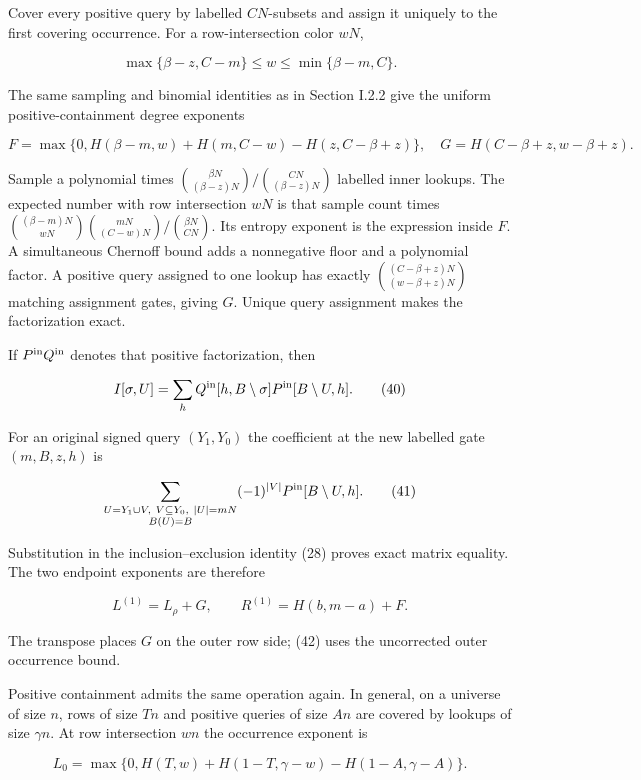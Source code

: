 Cover every positive query by labelled \(CN\)-subsets and assign it uniquely to the first covering occurrence. For a row-intersection color \(wN\),

\[
\max\{\beta-z,C-m\}\le w\le\min\{\beta-m,C\}.
\tag{38}
\]

The same sampling and binomial identities as in Section I.2.2 give the uniform positive-containment degree exponents

\[
F=\max\{0,H(\beta-m,w)+H(m,C-w)-H(z,C-\beta+z)\},
\quad G=H(C-\beta+z,w-\beta+z).
\tag{39}
\]

Sample a polynomial times \(\binom{\beta N}{(\beta-z)N}/\binom{CN}{(\beta-z)N}\) labelled inner lookups. The expected number with row intersection \(wN\) is that sample count times \(\binom{(\beta-m)N}{wN}\binom{mN}{(C-w)N}/\binom{\beta N}{CN}\). Its entropy exponent is the expression inside \(F\). A simultaneous Chernoff bound adds a nonnegative floor and a polynomial factor. A positive query assigned to one lookup has exactly \(\binom{(C-\beta+z)N}{(w-\beta+z)N}\) matching assignment gates, giving \(G\). Unique query assignment makes the factorization exact.

If \(P^{\rm in}Q^{\rm in}\) denotes that positive factorization, then

\[
I[\sigma,U]=\sum_h Q^{\rm in}[h,B\setminus\sigma]
                         P^{\rm in}[B\setminus U,h].
\tag{40}
\]

For an original signed query \((Y_1,Y_0)\) the coefficient at the new labelled gate \((m,B,z,h)\) is

\[
\sum_{\substack{U=Y_1\cup V,\ V\subseteq Y_0,\ |U|=mN\\B(U)=B}}
(-1)^{|V|}P^{\rm in}[B\setminus U,h].
\tag{41}
\]

Substitution in the inclusion--exclusion identity (28) proves exact matrix equality. The two endpoint exponents are therefore

\[
L^{(1)}=L_\rho+G,\qquad R^{(1)}=H(b,m-a)+F.
\tag{42}
\]

The transpose places \(G\) on the outer row side; (42) uses the uncorrected outer occurrence bound.

Positive containment admits the same operation again. In general, on a universe of size \(n\), rows of size \(Tn\) and positive queries of size \(An\) are covered by lookups of size \(\gamma n\). At row intersection \(wn\) the occurrence exponent is

\[
L_0=\max\{0,H(T,w)+H(1-T,\gamma-w)-H(1-A,\gamma-A)\}.
\]

